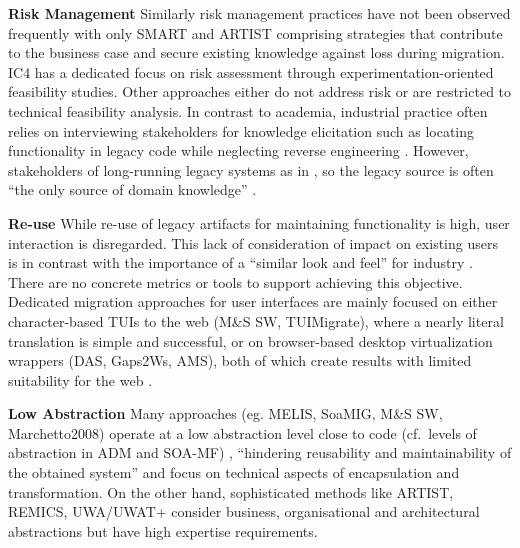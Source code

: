 \textbf{Risk Management} Similarly risk management practices have not been observed frequently with only SMART and ARTIST comprising strategies that contribute to the business case and secure existing knowledge against loss during migration.
IC4 has a dedicated focus on risk assessment through experimentation-oriented feasibility studies.
Other approaches either do not address risk or are restricted to technical feasibility analysis.
In contrast to academia, industrial practice often relies on interviewing stakeholders for knowledge elicitation such as locating functionality in legacy code while neglecting reverse engineering \autocite{Razavian2013PHD,Razavian2012}.
However, stakeholders of long-running legacy systems as in , so the legacy source is often ``the only source of domain knowledge'' \autocite{Bodhuin2002DesktopWebMVC}.

\textbf{Re-use} While re-use of legacy artifacts for maintaining functionality is high, user interaction is disregarded.
This lack of consideration of impact on existing users is in contrast with the importance of a ``similar look and feel'' for industry \autocite{Rodriguez-Echeverria2012MIGRARIA,Lucia2008,Distante2002}.
There are no concrete metrics or tools to support achieving this objective.
Dedicated migration approaches for user interfaces are mainly focused on either character-based TUIs to the web (M\&S SW, TUIMigrate), where a nearly literal translation is simple and successful, or on browser-based desktop virtualization wrappers (DAS, Gaps2Ws, AMS), both of which create results with limited suitability for the web \autocite{Distante2006a}.

\textbf{Low Abstraction} Many approaches (eg.
MELIS, SoaMIG, M\&S SW, Marchetto2008) operate at a low abstraction level close to code (cf.~levels of abstraction in ADM and SOA-MF) , ``hindering reusability and maintainability of the obtained system'' \autocite{Sosa2014MigraSOA} and focus on technical aspects of encapsulation and transformation.
On the other hand, sophisticated methods like ARTIST, REMICS, UWA/UWAT+ consider business, organisational and architectural abstractions but have high expertise requirements.

